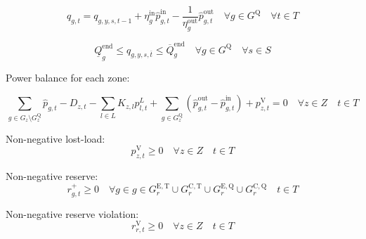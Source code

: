 \documentclass{article}
\newcommand{\sGenerators}{G}
\newcommand{\sGeneratorsExistingThermal}{G^{\mathrm{E,T}}}
\newcommand{\sGeneratorsCandidateThermal}{G^{\mathrm{C,T}}}
\newcommand{\sStorage}{G^{\mathrm{Q}}}
\newcommand{\sStorageExisting}{G^{\mathrm{E,Q}}}
\newcommand{\sStorageCandidate}{G^{\mathrm{C,Q}}}
\newcommand{\sScenarios}{S}
\newcommand{\sIntervals}{T}
\newcommand{\sZones}{Z}
\newcommand{\sLinks}{L}
\newcommand{\iGenerator}{g}
\newcommand{\iYear}{y}
\newcommand{\iScenario}{s}
\newcommand{\iInterval}{t}
\newcommand{\iIntervalTerminal}{\overline{\iInterval}}
\newcommand{\iZone}{z}
\newcommand{\iRegion}{r}
\newcommand{\iLink}{l}
\newcommand{\cStorageUnitEnergyIntervalEndMax}[1][\iGenerator]{\overline{Q}^{\mathrm{end}}_{#1}}
\newcommand{\cStorageUnitEnergyIntervalEndMin}[1][\iGenerator]{\underline{Q}^{\mathrm{end}}_{#1}}
\newcommand{\cStorageUnitEfficiencyCharging}{\eta_{\iGenerator}^{\mathrm{in}}}
\newcommand{\cStorageUnitEfficiencyDischarging}{\eta_{\iGenerator}^{\mathrm{out}}}
\newcommand{\cDemand}[1][\iZone,\iInterval]{D_{#1}}
\newcommand{\cIncidenceMatrix}[1][\iZone,\iLink]{K_{#1}}
\newcommand{\vReserveUp}[1][\iGenerator,\iInterval]{r^{+}_{#1}}
\newcommand{\vReserveUpViolation}[1][\iRegion,\iInterval]{r^{\mathrm{V}}_{#1}}
\newcommand{\vPowerTotal}[1][\iGenerator,\iInterval]{\hat{p}_{#1}}
\newcommand{\vPowerTotalIn}[1][\iGenerator,\iInterval]{\hat{p}^{\mathrm{in}}_{#1}}
\newcommand{\vPowerTotalOut}[1][\iGenerator,\iInterval]{\hat{p}^{\mathrm{out}}_{#1}}
\newcommand{\vStorageUnitEnergy}[1][\iGenerator,\iInterval]{q_{#1}}
\newcommand{\vPowerFlow}[1][\iLink,\iInterval]{p^{\sLinks}_{#1}}
\newcommand{\vLostLoadPower}[1][\iZone,\iInterval]{p^{\mathrm{V}}_{#1}}
\newcommand{\vInstalledCapacityTotalScenario}[1][\iGenerator,\iYear,\iScenario]{b_{#1}}
\begin{document}

\begin{equation}
\vStorageUnitEnergy = \vStorageUnitEnergy[\iGenerator,\iYear,\iScenario,\iInterval-1] + \cStorageUnitEfficiencyCharging \vPowerTotalIn - \frac{1}{\cStorageUnitEfficiencyDischarging} \vPowerTotalOut \quad \forall \iGenerator \in \sStorage  \quad \forall \iInterval \in \sIntervals
\end{equation}

\begin{equation}
\cStorageUnitEnergyIntervalEndMin \leq \vStorageUnitEnergy[\iGenerator,\iYear,\iScenario,\iIntervalTerminal] \leq \cStorageUnitEnergyIntervalEndMax \quad \forall \iGenerator \in \sStorage  \quad \forall \iScenario \in \sScenarios
\end{equation}

Power balance for each zone:

\begin{equation}
\sum\limits_{\iGenerator \in \sGenerators_{\iZone} \setminus \sStorage_{\iZone}} \vPowerTotal - \cDemand - \sum\limits_{\iLink \in \sLinks} \cIncidenceMatrix \vPowerFlow + \sum\limits_{\iGenerator \in \sStorage_{\iZone}} \left(\vPowerTotalOut - \vPowerTotalIn\right) + \vLostLoadPower = 0 \quad \forall \iZone \in \sZones  \quad \iInterval \in \sIntervals
\end{equation}

Non-negative lost-load:
\begin{equation}
\vLostLoadPower \geq 0 \quad \forall \iZone \in \sZones  \quad \iInterval \in \sIntervals
\end{equation}

Non-negative reserve:
\begin{equation}
\vReserveUp \geq 0 \quad \forall \iGenerator \in \iGenerator \in \sGeneratorsExistingThermal_{\iRegion} \cup \sGeneratorsCandidateThermal_{\iRegion} \cup \sStorageExisting_{\iRegion} \cup \sStorageCandidate_{\iRegion}  \quad \iInterval \in \sIntervals
\end{equation}

Non-negative reserve violation:
\begin{equation}
\vReserveUpViolation \geq 0 \quad \forall \iZone \in \sZones  \quad \iInterval \in \sIntervals
\end{equation}
\end{document}
